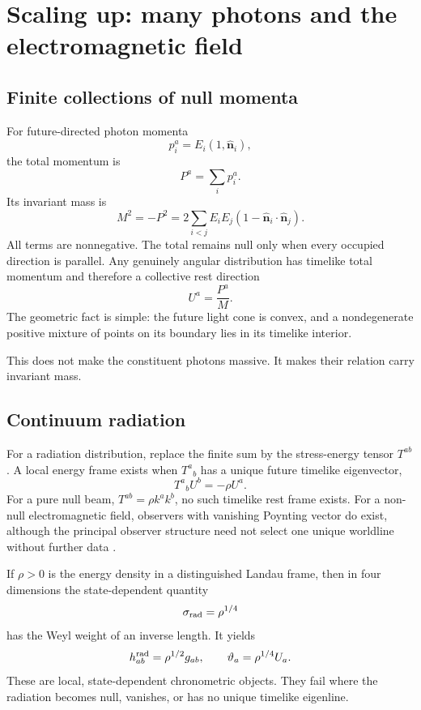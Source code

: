 \documentclass[11pt,a4paper]{article}
\begin{document}
\section{Scaling up: many photons and the electromagnetic field}

\subsection{Finite collections of null momenta}

For future-directed photon momenta
\[
p_i^a=E_i(1,\widehat{\bm n}_i),
\]
the total momentum is
\[
P^a=\sum_i p_i^a.
\]
Its invariant mass is
\begin{equation}
M^2=-P^2
=2\sum_{i<j}E_iE_j\left(1-\widehat{\bm n}_i\cdot\widehat{\bm n}_j\right).
\label{eq:Nphotonmass}
\end{equation}
All terms are nonnegative. The total remains null only when every occupied direction is parallel. Any genuinely angular distribution has timelike total momentum and therefore a collective rest direction
\[
U^a=\frac{P^a}{M}.
\]
The geometric fact is simple: the future light cone is convex, and a nondegenerate positive mixture of points on its boundary lies in its timelike interior.

This does not make the constituent photons massive. It makes their relation carry invariant mass.

\subsection{Continuum radiation}

For a radiation distribution, replace the finite sum by the stress-energy tensor $T^{ab}$. A local energy frame exists when $T^a{}_b$ has a unique future timelike eigenvector,
\begin{equation}
T^a{}_bU^b=-\rho U^a.
\label{eq:Landau}
\end{equation}
For a pure null beam, $T^{ab}=\rho k^ak^b$, no such timelike rest frame exists. For a non-null electromagnetic field, observers with vanishing Poynting vector do exist, although the principal observer structure need not select one unique worldline without further data \cite{Wylleman2021}.

If $\rho>0$ is the energy density in a distinguished Landau frame, then in four dimensions the state-dependent quantity
\[
\sigma_{\rm rad}=\rho^{1/4}
\]
has the Weyl weight of an inverse length. It yields
\begin{equation}
h^{\rm rad}_{ab}=\rho^{1/2}g_{ab},
\qquad
\vartheta_a=\rho^{1/4}U_a.
\label{eq:radiationclock}
\end{equation}
These are local, state-dependent chronometric objects. They fail where the radiation becomes null, vanishes, or has no unique timelike eigenline.
\end{document}
